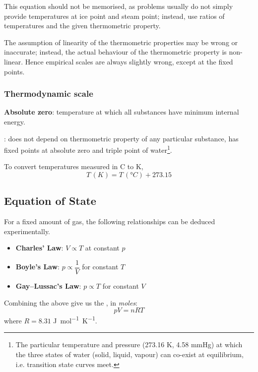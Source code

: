 \begin{remark}
This equation should not be memorised, as problems usually do not simply provide temperatures at ice point and steam point; instead, use ratios of temperatures and the given thermometric property.
\end{remark}

\begin{remark}
The assumption of linearity of the thermometric properties may be wrong or inaccurate; instead, the actual behaviour of the thermometric property is non-linear. Hence empirical scales are always slightly wrong, except at the fixed points.
\end{remark}

\subsubsection{Thermodynamic scale}
\textbf{Absolute zero}: temperature at which all substances have minimum internal energy.

: does not depend on thermometric property of any particular substance, has fixed points at absolute zero and triple point of water\footnote{The particular temperature and pressure (273.16 K, 4.58 mmHg) at which the three states of water (solid, liquid, vapour) can co-exist at equilibrium, i.e. transition state curves meet.}.

To convert temperatures measured in \degree C to K,
\[ T\,(\unit{K}) = T\,(\unit{\degree C}) + 273.15 \]
\pagebreak

\subsection{Equation of State}
For a fixed amount of gas, the following relationships can be deduced experimentally.
\begin{itemize}
\item \textbf{Charles' Law}: $V \propto T$ at constant $p$
\item \textbf{Boyle's Law}: $p \propto \dfrac{1}{V}$ for constant $T$
\item \textbf{Gay--Lussac's Law}: $p \propto T$ for constant $V$
\end{itemize}

Combining the above give us the , in \emph{moles}:
\begin{equation}
pV=nRT
\end{equation}
where  $R=8.31$ \unit{J.mol^{-1}.K^{-1}}.


